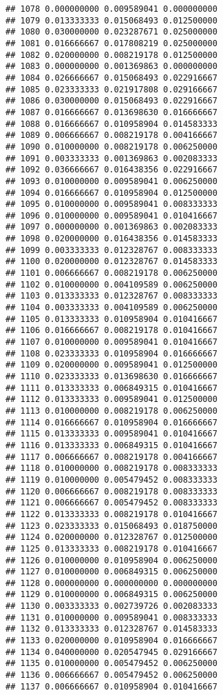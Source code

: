 \documentclass[
]{article}
\begin{document}
\begin{verbatim}
## 1078 0.000000000 0.009589041 0.000000000
## 1079 0.013333333 0.015068493 0.012500000
## 1080 0.030000000 0.023287671 0.025000000
## 1081 0.016666667 0.017808219 0.025000000
## 1082 0.020000000 0.008219178 0.012500000
## 1083 0.000000000 0.001369863 0.000000000
## 1084 0.026666667 0.015068493 0.022916667
## 1085 0.023333333 0.021917808 0.029166667
## 1086 0.030000000 0.015068493 0.022916667
## 1087 0.016666667 0.013698630 0.016666667
## 1088 0.016666667 0.010958904 0.014583333
## 1089 0.006666667 0.008219178 0.004166667
## 1090 0.010000000 0.008219178 0.006250000
## 1091 0.003333333 0.001369863 0.002083333
## 1092 0.036666667 0.016438356 0.022916667
## 1093 0.010000000 0.009589041 0.006250000
## 1094 0.016666667 0.010958904 0.012500000
## 1095 0.010000000 0.009589041 0.008333333
## 1096 0.010000000 0.009589041 0.010416667
## 1097 0.000000000 0.001369863 0.002083333
## 1098 0.020000000 0.016438356 0.014583333
## 1099 0.003333333 0.012328767 0.008333333
## 1100 0.020000000 0.012328767 0.014583333
## 1101 0.006666667 0.008219178 0.006250000
## 1102 0.010000000 0.004109589 0.006250000
## 1103 0.013333333 0.012328767 0.008333333
## 1104 0.003333333 0.004109589 0.006250000
## 1105 0.013333333 0.010958904 0.010416667
## 1106 0.016666667 0.008219178 0.010416667
## 1107 0.010000000 0.009589041 0.010416667
## 1108 0.023333333 0.010958904 0.016666667
## 1109 0.020000000 0.009589041 0.012500000
## 1110 0.023333333 0.013698630 0.016666667
## 1111 0.013333333 0.006849315 0.010416667
## 1112 0.013333333 0.009589041 0.012500000
## 1113 0.010000000 0.008219178 0.006250000
## 1114 0.016666667 0.010958904 0.016666667
## 1115 0.013333333 0.009589041 0.010416667
## 1116 0.013333333 0.006849315 0.010416667
## 1117 0.006666667 0.008219178 0.004166667
## 1118 0.010000000 0.008219178 0.008333333
## 1119 0.010000000 0.005479452 0.008333333
## 1120 0.006666667 0.008219178 0.008333333
## 1121 0.006666667 0.005479452 0.008333333
## 1122 0.013333333 0.008219178 0.010416667
## 1123 0.023333333 0.015068493 0.018750000
## 1124 0.020000000 0.012328767 0.012500000
## 1125 0.013333333 0.008219178 0.010416667
## 1126 0.010000000 0.010958904 0.006250000
## 1127 0.010000000 0.006849315 0.006250000
## 1128 0.000000000 0.000000000 0.000000000
## 1129 0.010000000 0.006849315 0.006250000
## 1130 0.003333333 0.002739726 0.002083333
## 1131 0.010000000 0.009589041 0.008333333
## 1132 0.013333333 0.012328767 0.014583333
## 1133 0.020000000 0.010958904 0.016666667
## 1134 0.040000000 0.020547945 0.029166667
## 1135 0.010000000 0.005479452 0.006250000
## 1136 0.006666667 0.005479452 0.006250000
## 1137 0.006666667 0.010958904 0.010416667

\end{verbatim}
\end{document}
